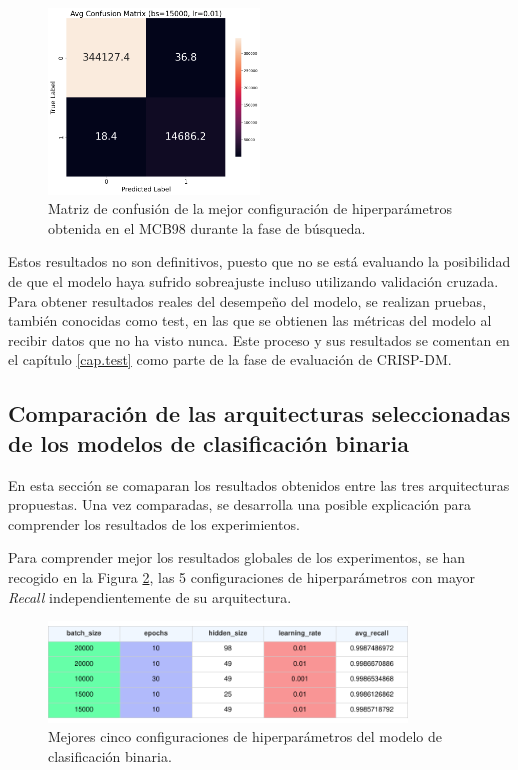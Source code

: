 \begin{figure}[H]
    \centering
    \includegraphics[width=0.5\textwidth]{./img/modelo/matrices_confusion/MC_ENT_MCB98.png}
    \caption{Matriz de confusión de la mejor configuración de hiperparámetros obtenida en el MCB98 durante la fase de búsqueda.}
    \label{fig:MC_ENT_MCB98}
\end{figure}



Estos resultados no son definitivos, puesto que no se está evaluando la posibilidad de que el modelo haya sufrido sobreajuste incluso utilizando validación cruzada. Para obtener resultados reales del desempeño del modelo, se realizan pruebas, también conocidas como test, en las que se obtienen las métricas del modelo al recibir datos que no ha visto nunca. Este proceso y sus resultados se comentan en el capítulo \ref{cap.test} como parte de la fase de evaluación de CRISP-DM.


\subsection{Comparación de las arquitecturas seleccionadas de los modelos de clasificación binaria} \label{sec:comp.BIN}
En esta sección se comaparan los resultados obtenidos entre las tres arquitecturas propuestas. Una vez comparadas, se desarrolla una posible explicación para comprender los resultados de los experimientos.

Para comprender mejor los resultados globales de los experimentos, se han recogido en la Figura \ref{fig:BINtop5}, las 5 configuraciones de hiperparámetros con mayor \textit{Recall} independientemente de su arquitectura.

\begin{figure}[H]
    \centering
    \includegraphics[width=0.85\textwidth]{./img/modelo/resultados/BINtop5.pdf}
    \caption{Mejores cinco configuraciones de hiperparámetros del modelo de clasificación binaria.}
    \label{fig:BINtop5}
\end{figure}

